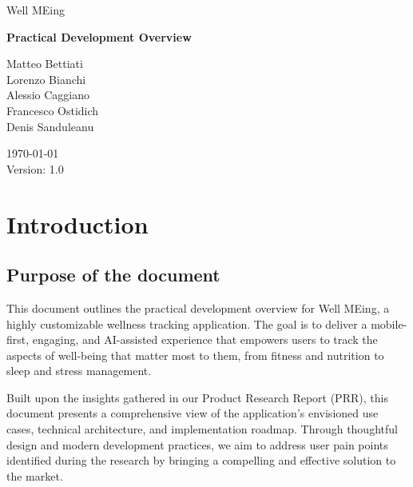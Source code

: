 \documentclass{article}
\begin{document}


\begin{center}

    \fontsize{20pt}{30pt}\selectfont
    Well MEing

    \vspace{2cm}

    \fontsize{25pt}{45pt}\selectfont
    \textbf{Practical Development Overview}

    \vfill

    \fontsize{12pt}{18pt}\selectfont
    Matteo Bettiati \\
    Lorenzo Bianchi \\
    Alessio Caggiano \\
    Francesco Ostidich \\
    Denis Sanduleanu \\

    \vspace{1cm}

    \today \\
    \vspace{12pt}
    Version: 1.0
    \normalsize

\end{center}

\newpage
{}
\tableofcontents
\newpage



\section{Introduction}

\subsection{Purpose of the document}

This document outlines the practical development overview for Well MEing, a highly customizable wellness tracking application.
The goal is to deliver a mobile-first, engaging, and AI-assisted experience that empowers users to track the aspects of well-being that matter most to them, from fitness and nutrition to sleep and stress management.

Built upon the insights gathered in our Product Research Report (PRR), this document presents a comprehensive view of the application's envisioned use cases, technical architecture, and implementation roadmap.
Through thoughtful design and modern development practices, we aim to address user pain points identified during the research by bringing a compelling and effective solution to the market.
\end{document}
